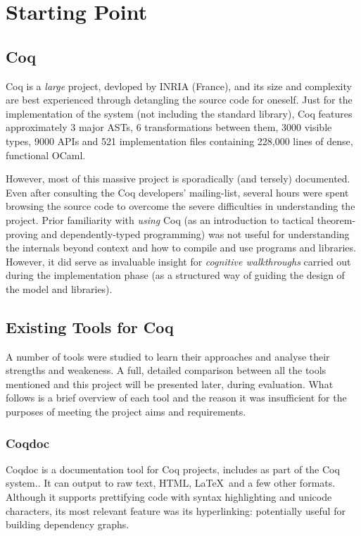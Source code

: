 \section{Starting Point}

\subsection{Coq}

Coq is a \emph{large} project, devloped by INRIA (France), and its size and
complexity are best experienced through detangling the source code for oneself.
Just for the implementation of the system (not including the standard library),
Coq features approximately 3 major ASTs, 6 transformations between them, 3000
visible types, 9000 APIs and 521 implementation files containing 228,000 lines
of dense, functional OCaml.

However, most of this massive project is sporadically (and tersely) documented.
Even after consulting the Coq developers' mailing-list, several hours were spent
browsing the source code to overcome the severe difficulties in understanding
the project. Prior familiarity with \emph{using} Coq (as an introduction
to tactical theorem-proving and dependently-typed programming) was not useful
for understanding the internals beyond context and how to compile and use
programs and libraries. However, it did serve as invaluable insight for
\emph{cognitive walkthroughs} carried out during the implementation phase
(as a structured way of guiding the design of the model and libraries).

\subsection{Existing Tools for Coq}
A number of tools were studied to learn their approaches and analyse their
strengths and weakeness. A full, detailed comparison between all the tools
mentioned and this project will be presented later, during evaluation.  What
follows is a brief overview of each tool and the reason it was insufficient for
the purposes of meeting the project aims and requirements.

\subsubsection{Coqdoc}

Coqdoc is a documentation tool for Coq projects, includes as part of the Coq
system.. It can output to raw text, HTML, \LaTeX~and a few other formats.
Although it supports prettifying code with syntax highlighting and unicode
characters, its most relevant feature was its hyperlinking: potentially useful
for building dependency graphs.

